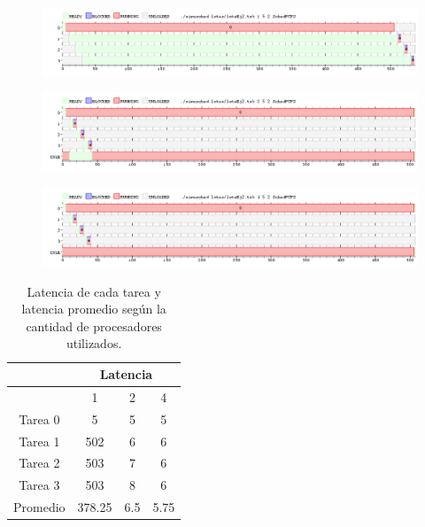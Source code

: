 
\begin{figure}[H]
  \centering
  \includegraphics[width=1\textwidth]{img/imgEj2-1}
  \caption{}
  \label{fig:ej2-1}
\end{figure}

\begin{figure}[H]
  \centering
  \includegraphics[width=1\textwidth]{img/imgEj2-2}
  \caption{}
  \label{fig:ej2-2}
\end{figure}

\begin{figure}[H]
  \centering
  \includegraphics[width=1\textwidth]{img/imgEj2-3}
  \caption{}
  \label{fig:ej2-3}
\end{figure}

\begin{table}[H]
  \center
  \begin{center}
  \begin{tabular}{c|c|c|c|}
    \cline{2-4}
    & \multicolumn{3}{|c|}{\cellcolor{LightCyan}Latencia} \\
    \hline
    \rowcolor{LightCyan}
    \multicolumn{1}{|c|}{\#Procesadores} & 1 & 2 & 4 \\
    \hline
    \multicolumn{1}{|c|}{\cellcolor{LightCyan}Tarea 0} & 5 & 5 & 5 \\
    \multicolumn{1}{|c|}{\cellcolor{LightCyan}Tarea 1} & 502 & 6 & 6 \\
    \multicolumn{1}{|c|}{\cellcolor{LightCyan}Tarea 2} & 503 & 7 & 6 \\
    \multicolumn{1}{|c|}{\cellcolor{LightCyan}Tarea 3} & 503 & 8 & 6 \\
    \hline
    \multicolumn{1}{|c|}{\cellcolor{LightCyan}Promedio} & 378.25 & 6.5 & 5.75 \\
    \hline
  \end{tabular}
  \end{center}
  \caption{\footnotesize Latencia de cada tarea y latencia promedio según la cantidad de procesadores utilizados.}
  \label{tab:ej2}
\end{table}

